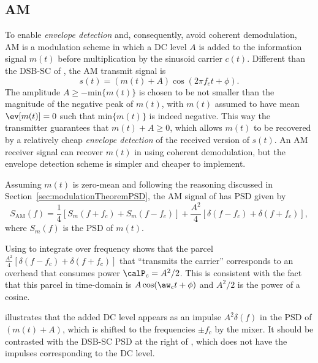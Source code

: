 \subsection{AM}
To enable \emph{envelope detection} and, consequently, avoid coherent demodulation, AM is a modulation scheme in which a DC level $A$ is added to the information signal $m(t)$ before multiplication by the sinusoid carrier $c(t)$. Different than the DSB-SC of , the AM transmit signal is
\begin{equation}
s(t) = (m(t) + A) \cos(2 \pi f_c t + \phi).
\label{eq:amSignal}
\end{equation}
The amplitude $A \ge -\textrm{min}\{m(t)\}$ is chosen to be not smaller than the magnitude of the negative peak of $m(t)$, with $m(t)$ assumed to have mean $\ev[m(t)]=0$ such that $\textrm{min}\{m(t)\}$ is indeed negative. This way the transmitter guarantees that $m(t)+A \ge 0$, which allows $m(t)$ to be recovered by a relatively cheap \emph{envelope detection} of the received version of $s(t)$. An AM receiver signal can recover $m(t)$ in  using  coherent demodulation, but the envelope detection scheme is simpler and cheaper to implement. 

Assuming $m(t)$ is zero-mean and following the reasoning discussed in Section~\ref{sec:modulationTheoremPSD}, the AM signal of  has PSD given by
\begin{equation}
S_{\textrm{AM}}(f) = \frac{1}{4} \left[S_m(f+f_c) + S_m(f-f_c) \right] + \frac{A^2}{4} \left[ \delta(f-f_c) +  \delta(f+f_c) \right],
\label{eq:amPSD}
\end{equation}
where $S_m(f)$ is the PSD of $m(t)$.

Using  to integrate  over frequency shows that the parcel $\frac{A^2}{4} [\delta(f-f_c) + \delta(f+f_c)]$ that ``transmits the carrier'' corresponds to an overhead that consumes power $\calP_c = A^2/2$. 
This is consistent with the fact that this parcel in time-domain is
$A \cos(\aw_c t + \phi)$ and $A^2/2$ is the power of a cosine.

 illustrates that the added DC level appears as an impulse $A^2 \delta(f)$ in the PSD of $(m(t)+A)$, which is shifted to the frequencies $\pm f_c$ by the mixer. It should be contrasted with the DSB-SC PSD at the right of , which does not have the impulses corresponding to the DC level.

